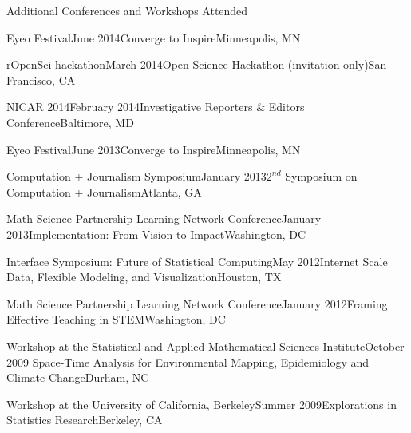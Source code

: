 \documentclass{resume} %
\begin{document}
\begin{rSection}{Additional Conferences and Workshops Attended}
\begin{sSubsection}{Eyeo Festival}{}{June 2014}{Converge to Inspire}{Minneapolis, MN}
\end{sSubsection}

\begin{sSubsection}{rOpenSci hackathon}{}{March 2014}{Open Science Hackathon (invitation only)}{San Francisco, CA}
\end{sSubsection}

\begin{sSubsection}{NICAR 2014}{}{February 2014}{Investigative Reporters \& Editors Conference}{Baltimore, MD}
\end{sSubsection}

\begin{sSubsection}{Eyeo Festival}{}{June 2013}{Converge to Inspire}{Minneapolis, MN}
\end{sSubsection}

\begin{sSubsection}{Computation + Journalism Symposium}{}{January 2013}{$2^{nd}$ Symposium on Computation + Journalism}{Atlanta, GA}
\end{sSubsection}

\begin{sSubsection}{Math Science Partnership Learning Network Conference}{}{January 2013}{Implementation: From Vision to Impact}{Washington, DC}
\end{sSubsection}

\begin{sSubsection}{Interface Symposium: Future of Statistical Computing}{}{May 2012}{Internet Scale Data, Flexible Modeling, and Visualization}{Houston, TX}
\end{sSubsection}

\begin{sSubsection}{Math Science Partnership Learning Network Conference}{}{January 2012}{Framing Effective Teaching in STEM}{Washington, DC}
\end{sSubsection}

\begin{sSubsection}{Workshop at the Statistical and Applied Mathematical Sciences Institute}{}{October 2009}{ Space-Time Analysis for Environmental Mapping, Epidemiology and Climate Change}{Durham, NC}
\end{sSubsection}

\begin{sSubsection}{Workshop at the University of California, Berkeley}{}{Summer 2009}{Explorations in Statistics Research}{Berkeley, CA}
\end{sSubsection}
\end{rSection}
\end{document}
